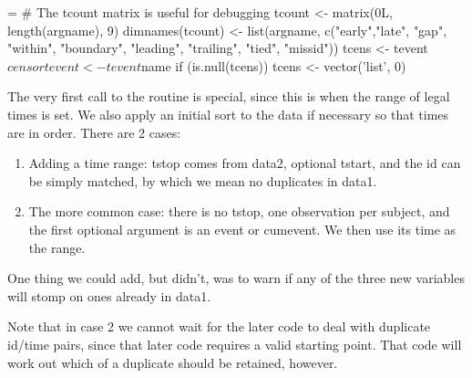 \documentclass{article}
\begin{document}
\begin{nwchunk}
=
 # The tcount matrix is useful for debugging
 tcount <- matrix(0L, length(argname), 9)
 dimnames(tcount) <- list(argname, c("early","late", "gap", "within", 
                                     "boundary", "leading", "trailing",
                                     "tied", "missid"))
 tcens <- tevent$censor
 tevent <- tevent$name
 if (is.null(tcens)) tcens <- vector('list', 0)
\end{nwchunk}

The very first call to the routine is special, since this is when the
range of legal times is set. We also apply an initial sort to the data
if necessary so that times are in order.
There are 2 cases:
\begin{enumerate}
  \item Adding a time range: tstop comes from data2, optional tstart, and the
    id can be simply matched, by which we mean no duplicates in data1.
  \item The more common case: there is no tstop, one observation per subject,
    and the first optional argument is an
    event or cumevent.  We then use its time as the range.
\end{enumerate} 
One thing we could add, but didn't, was to warn if any of the three new
variables will stomp on ones already in data1.

Note that in case 2 we cannot wait for the later code to deal with duplicate
id/time pairs, since that later code requires a valid starting point.  That
code will work out which of a duplicate should be retained, however.
\end{document}
